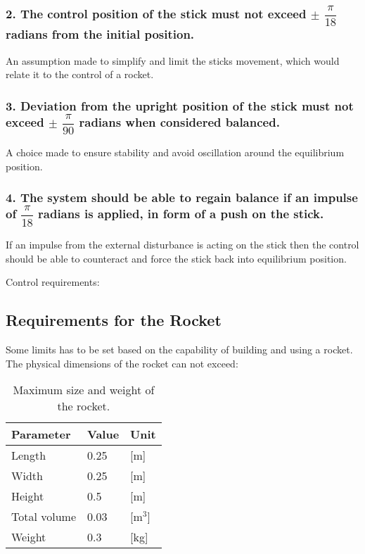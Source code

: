\subsubsection*{2. The control position of the stick must not exceed $\pm$ $\dfrac{\pi}{18}$ radians from the initial position.}
\forceindent An assumption made to simplify and limit the sticks movement, which would relate it to the control of a rocket.
\subsubsection*{3. Deviation from the upright position of the stick must not exceed $\pm$  $\dfrac{\pi}{90}$ radians when considered balanced.}
\forceindent A choice made to ensure stability and avoid oscillation around the equilibrium position.

\subsubsection*{4. The system should be able to regain balance if an impulse of $\dfrac{\pi}{18}$ radians is applied, in form of a push on the stick.} 
\forceindent If an impulse from the external disturbance is acting on the stick then the control should be able to counteract and force the stick back into equilibrium position. 


Control requirements:



\subsection{Requirements for the Rocket}
Some limits has to be set based on the capability of building and using a rocket.  
The physical dimensions of the rocket can not exceed:
\begin{table}[htbp]
\centering
\begin{tabular}{lll}
\hline
Parameter    & Value & Unit  \\ \hline
Length       & 0.25  & [m]     \\
Width        & 0.25  & [m]     \\
Height       & 0.5   & [m]     \\
Total volume & 0.03  & [m$^3$] \\
Weight       & 0.3   & [kg]   
\end{tabular}
\caption{Maximum size and weight of the rocket.}
\label{RocketDimensions}
\end{table}


